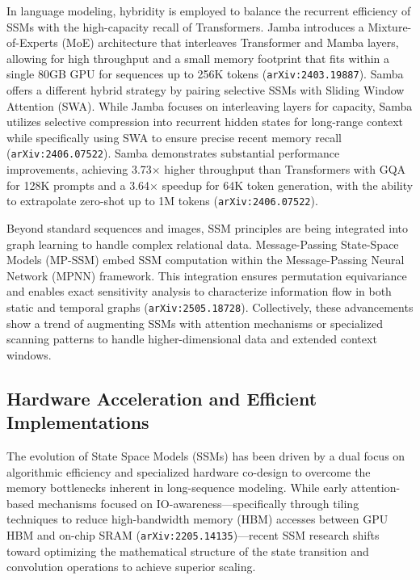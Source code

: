 \documentclass[11pt]{article}
\begin{document}
In language modeling, hybridity is employed to balance the recurrent efficiency of SSMs with the high-capacity recall of Transformers. Jamba introduces a Mixture-of-Experts (MoE) architecture that interleaves Transformer and Mamba layers, allowing for high throughput and a small memory footprint that fits within a single 80GB GPU for sequences up to 256K tokens (\texttt{arXiv:2403.19887}). Samba offers a different hybrid strategy by pairing selective SSMs with Sliding Window Attention (SWA). While Jamba focuses on interleaving layers for capacity, Samba utilizes selective compression into recurrent hidden states for long-range context while specifically using SWA to ensure precise recent memory recall (\texttt{arXiv:2406.07522}). Samba demonstrates substantial performance improvements, achieving 3.73× higher throughput than Transformers with GQA for 128K prompts and a 3.64× speedup for 64K token generation, with the ability to extrapolate zero-shot up to 1M tokens (\texttt{arXiv:2406.07522}).

Beyond standard sequences and images, SSM principles are being integrated into graph learning to handle complex relational data. Message-Passing State-Space Models (MP-SSM) embed SSM computation within the Message-Passing Neural Network (MPNN) framework. This integration ensures permutation equivariance and enables exact sensitivity analysis to characterize information flow in both static and temporal graphs (\texttt{arXiv:2505.18728}). Collectively, these advancements show a trend of augmenting SSMs with attention mechanisms or specialized scanning patterns to handle higher-dimensional data and extended context windows.

\subsection{Hardware Acceleration and Efficient Implementations}

The evolution of State Space Models (SSMs) has been driven by a dual focus on algorithmic efficiency and specialized hardware co-design to overcome the memory bottlenecks inherent in long-sequence modeling. While early attention-based mechanisms focused on IO-awareness—specifically through tiling techniques to reduce high-bandwidth memory (HBM) accesses between GPU HBM and on-chip SRAM (\texttt{arXiv:2205.14135})—recent SSM research shifts toward optimizing the mathematical structure of the state transition and convolution operations to achieve superior scaling.
\end{document}
